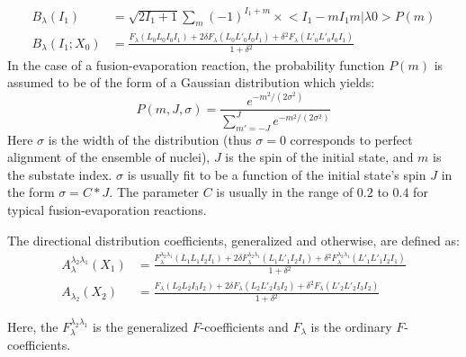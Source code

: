 \begin{align}
B_{\lambda{}}\left(I_1\right) &= \sqrt{2I_1+1}\sum\limits_{m}^{}(-1)^{I_1+m} \times{}<I_1 -m I_1 m | \lambda{} 0> P(m) \label{eqn:chp3-orient-fus-evap}\\
B_{\lambda{}}\left(I_1;X_0\right) &= \frac{F_{\lambda{}}(L_0 L_0 I_0 I_1) + 2 \delta{} F_{\lambda{}}(L_0 L'_0 I_0 I_1) + \delta{}^2 F_{\lambda{}}(L'_0 L'_0 I_0 I_1)}{1+\delta{}^2} \label{eqn:chp3-orient-preceding}
\end{align}
In the case of a fusion-evaporation reaction, the probability function $P(m)$ is assumed to be of the form of a Gaussian distribution\cite{angDist} which yields:
\begin{equation}
\label{eqn:chp3-fe-prob-func}
P(m,J,\sigma) = \frac{e^{-m^2/(2\sigma{}^2)}}{\sum\limits_{m'=-J}^{J}e^{-m^2/(2\sigma{}^2)}}
\end{equation}
Here $\sigma$ is the width of the distribution (thus $\sigma{}=0$ corresponds to perfect alignment of the ensemble of nuclei), $J$ is the spin of the initial state, and $m$ is the substate index. $\sigma$ is usually fit to be a function of the initial state's spin $J$ in the form $\sigma{}=C*J$. The parameter $C$ is usually in the range of $0.2$ to $0.4$ for typical fusion-evaporation reactions.

The directional distribution coefficients, generalized and otherwise, are defined as:
\begin{align}
A_{\lambda{}}^{\lambda{}_2\lambda{}_1}\left(X_1\right) &= \frac{F_{\lambda{}}^{\lambda{}_2\lambda{}_1}(L_1 L_1 I_2 I_1) + 2 \delta{} F_{\lambda{}}^{\lambda{}_2\lambda{}_1}(L_1 L'_1 I_2 I_1) + \delta{}^2 F_{\lambda{}}^{\lambda{}_2\lambda{}_1}(L'_1 L'_1 I_2 I_1)}{1+\delta{}^2}\label{eqn:chp3-gen-ddc}\\
A_{\lambda{}_2}\left(X_2\right) &= \frac{F_{\lambda{}}(L_2 L_2 I_3 I_2) + 2 \delta{} F_{\lambda{}}(L_2 L'_2 I_3 I_2) + \delta{}^2 F_{\lambda{}}(L'_2 L'_2 I_3 I_2)}{1+\delta{}^2} \label{eqn:chp3-ddc}
\end{align}

Here, the $F_{\lambda{}}^{\lambda{}_2\lambda{}_1}$ is the generalized $F$-coefficients and $F_{\lambda{}}$ is the ordinary $F$-coefficients.

